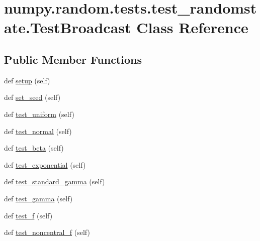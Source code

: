 \hypertarget{classnumpy_1_1random_1_1tests_1_1test__randomstate_1_1TestBroadcast}{}\section{numpy.\+random.\+tests.\+test\+\_\+randomstate.\+Test\+Broadcast Class Reference}
\label{classnumpy_1_1random_1_1tests_1_1test__randomstate_1_1TestBroadcast}
\subsection*{Public Member Functions}
\begin{DoxyCompactItemize}
\item 
def \hyperlink{classnumpy_1_1random_1_1tests_1_1test__randomstate_1_1TestBroadcast_ad13a87b6aa5e1fc7a9936f115353327c}{setup} (self)
\item 
def \hyperlink{classnumpy_1_1random_1_1tests_1_1test__randomstate_1_1TestBroadcast_a5f8f767b8df86b6d3f1ef7b300ec9a73}{set\+\_\+seed} (self)
\item 
def \hyperlink{classnumpy_1_1random_1_1tests_1_1test__randomstate_1_1TestBroadcast_ade69f20f64d3c1d78286a2566e5f2907}{test\+\_\+uniform} (self)
\item 
def \hyperlink{classnumpy_1_1random_1_1tests_1_1test__randomstate_1_1TestBroadcast_a574ef5f19c59d60d50347190644d48aa}{test\+\_\+normal} (self)
\item 
def \hyperlink{classnumpy_1_1random_1_1tests_1_1test__randomstate_1_1TestBroadcast_a7b12c69979b24736b099fe0a495e4906}{test\+\_\+beta} (self)
\item 
def \hyperlink{classnumpy_1_1random_1_1tests_1_1test__randomstate_1_1TestBroadcast_a9d30af2ac1478a919c60d7c08412a476}{test\+\_\+exponential} (self)
\item 
def \hyperlink{classnumpy_1_1random_1_1tests_1_1test__randomstate_1_1TestBroadcast_a5cbceead01f4f83faeddc93988629490}{test\+\_\+standard\+\_\+gamma} (self)
\item 
def \hyperlink{classnumpy_1_1random_1_1tests_1_1test__randomstate_1_1TestBroadcast_afa3163ec50bc792c119db5c980b84d44}{test\+\_\+gamma} (self)
\item 
def \hyperlink{classnumpy_1_1random_1_1tests_1_1test__randomstate_1_1TestBroadcast_a17a063120d46a0c243fbe885e00fe778}{test\+\_\+f} (self)
\item 
def \hyperlink{classnumpy_1_1random_1_1tests_1_1test__randomstate_1_1TestBroadcast_aba1d1297ceaa49a6eb75dc1b6b4a3a0c}{test\+\_\+noncentral\+\_\+f} (self)

\end{DoxyCompactItemize}
